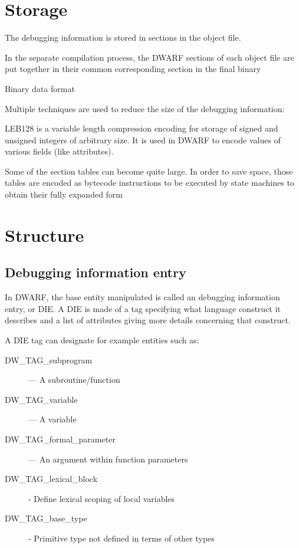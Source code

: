 \section{Storage}

The debugging information is stored in sections in the object file.

In the separate compilation process, the DWARF sections of each object file are
put together in their common corresponding section in the final binary

Binary data format

Multiple techniques are used to reduce the size of the debugging information:

LEB128 is a variable length compression encoding for storage of signed and unsigned integers of arbitrary size.
It is used in DWARF to encode values of various fields (like attributes).

Some of the section tables can become quite large.
In order to save space, those tables are encoded as bytecode instructions to be executed by state machines to obtain their fully expanded form

\section{Structure}

\subsection{Debugging information entry}

In DWARF, the base entity manipulated is called an debugging information entry, or DIE.
A DIE is made of a tag specifying what language construct it describes and a list of attributes giving more details concerning that construct.

A DIE tag can designate for example entities such as:
\begin{description}
    \item[DW\_TAG\_subprogram] — A subroutine/function
    \item[DW\_TAG\_variable] — A variable
    \item[DW\_TAG\_formal\_parameter] — An argument within function parameters
    \item[DW\_TAG\_lexical\_block] - Define lexical scoping of local variables
    \item[DW\_TAG\_base\_type] - Primitive type not defined in terms of other
        types
\end{description}

